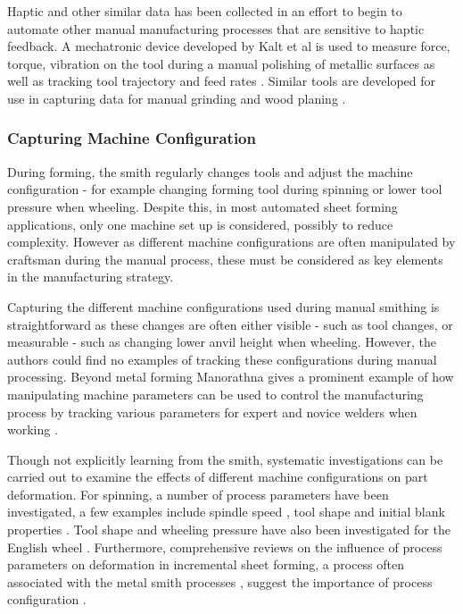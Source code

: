 Haptic and other similar data has been collected in an effort to begin to automate other manual manufacturing processes that are sensitive to haptic feedback. A mechatronic device developed by Kalt et al is used to measure force, torque, vibration on the tool during a manual polishing of metallic surfaces as well as tracking tool trajectory and feed rates \citep{Kalt2016TowardsOperation}. Similar tools are developed for use in capturing data for manual grinding \citep{Phan2018InstrumentationWorkpiece} and wood planing \citep{Montebelli2015OnTasks}.


\subsubsection{Capturing Machine Configuration}
During forming, the smith regularly changes tools and adjust the machine configuration - for example changing forming tool during spinning or lower tool pressure when wheeling. Despite this, in most automated sheet forming applications, only one machine set up is considered, possibly to reduce complexity. However as different machine configurations are often manipulated by craftsman during the manual process, these must be considered as key elements in the manufacturing strategy.

Capturing the different machine configurations used during  manual smithing is straightforward as these changes are often either visible - such as tool changes, or measurable - such as changing lower anvil height when wheeling. However, the authors could find no examples of tracking these configurations during manual processing. Beyond metal forming Manorathna gives a prominent example of how manipulating machine parameters can be used to control the manufacturing process by tracking various parameters for expert and novice welders when working \citep{Manorathna2017HumanAutomation}. 

Though not explicitly learning from the smith, systematic investigations can be carried out to examine the effects of different machine configurations on part deformation. For spinning, a number of process parameters have been investigated, a few examples include spindle speed \citep{Sugar2016AnalysisSteels,Essa2010OptimizationAnalysis}, tool shape \citep{El-Khabeery1991OnCups,Essa2010OptimizationAnalysis} and initial blank properties \citep{Watson2015InvestigationMethod}. Tool shape and wheeling pressure have also been investigated for the English wheel \citep{Bowen2021NumericalProcess}. Furthermore, comprehensive reviews on the influence of process parameters on deformation in incremental sheet forming, a process often associated with the metal smith processes \citep{Music2012TheTools}, suggest the importance of process configuration \citep{Gatea2016ReviewForming,Gohil2021ReviewProcess}.


